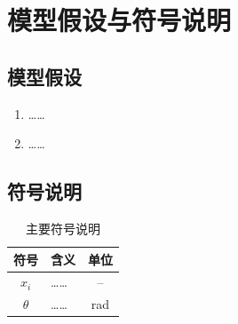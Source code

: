 \section{模型假设与符号说明}

\subsection{模型假设}

\begin{enumerate}[label=假设\arabic*：,leftmargin=*]
  \item ……
  \item ……
\end{enumerate}

\subsection{符号说明}

\begin{table}[H]
  \centering
  \caption{主要符号说明}
  \begin{tabular}{clc}
    \toprule
    符号 & 含义 & 单位 \\
    \midrule
    $x_i$    & …… & -- \\
    $\theta$ & …… & rad \\
    \bottomrule
  \end{tabular}
\end{table}

